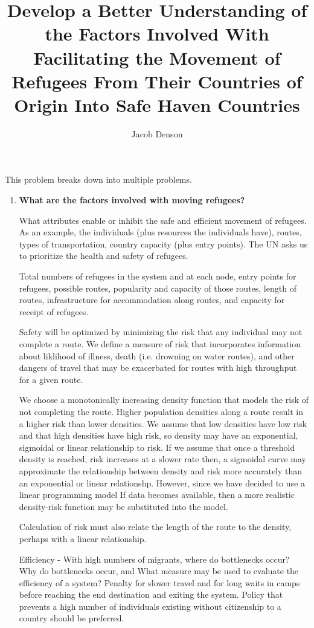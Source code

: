 \documentclass{article}
\title{Develop a Better Understanding of the Factors Involved With Facilitating the Movement of Refugees From Their Countries of Origin Into Safe Haven Countries}
\author{Jacob Denson}
\begin{document}
\maketitle

This problem breaks down into multiple problems.

\begin{enumerate}
    \item {\bf What are the factors involved with moving refugees?}

    What attributes enable or inhibit the safe and efficient movement of refugees. As an example, the individuals (plus resources the individuals have), routes, types of transportation, country capacity (plus entry points). The UN asks us to prioritize the health and safety of refugees.

    Total numbers of refugees in the system and at each node, entry points for refugees, possible routes, popularity and capacity of those routes, length of routes, infrastructure for accommodation along routes, and capacity for receipt of refugees.

    Safety will be optimized by minimizing the risk that any individual may not complete a route. We define a measure of risk that incorporates information about liklihood of illness, death (i.e. drowning on water routes), and other dangers of travel that may be exacerbated for routes with high throughput for a given route. 

    We choose a monotonically increasing density function that models the risk of not completing the route. Higher population densities along a route result in a higher risk than lower densities. We assume that low densities have low risk and that high densities have high risk, so density may have an exponential, sigmoidal or linear relationship to risk. If we assume that once a threshold density is reached, risk increases at a slower rate then, a sigmoidal curve may approximate the relationship between density and risk more accurately than an exponential or linear relationshp. However, since we have decided to use a linear programming model  If data becomes available, then a more realistic density-risk function may be substituted into the model.

    Calculation of risk must also relate the length of the route to the density, perhaps with a linear relationship. 

    Efficiency - With high numbers of migrants, where do bottlenecks occur? Why do bottlenecks occur, and  What measure may be used to evaluate the efficiency of a system? Penalty for slower travel and for long waits in camps before reaching the end destination and exiting the system. Policy that prevents a high number of individuals existing without citizenship to a country should be preferred.


\end{enumerate}
\end{document}
